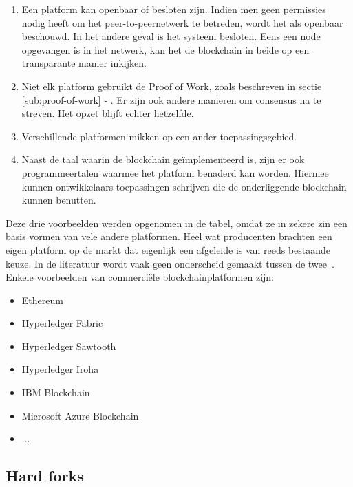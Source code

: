 \begin{enumerate}
	\item Een platform kan openbaar of besloten zijn. Indien men geen permissies nodig heeft om het peer-to-peernetwerk te betreden, wordt het als openbaar beschouwd. In het andere geval is het systeem besloten. Eens een node opgevangen is in het netwerk, kan het de blockchain in beide op een transparante manier inkijken.
	\item Niet elk platform gebruikt de Proof of Work, zoals beschreven in sectie \ref{sub:proof-of-work} - . Er zijn ook andere manieren om consensus na te streven. Het opzet blijft echter hetzelfde.
	\item Verschillende platformen mikken op een ander toepassingsgebied.
	\item Naast de taal waarin de blockchain geïmplementeerd is, zijn er ook programmeertalen waarmee het platform benaderd kan worden. Hiermee kunnen ontwikkelaars toepassingen schrijven die de onderliggende blockchain kunnen benutten. 
\end{enumerate}
	
\pagebreak
	
Deze drie voorbeelden werden opgenomen in de tabel, omdat ze in zekere zin een basis vormen van vele andere platformen. Heel wat producenten brachten een eigen platform op de markt dat eigenlijk een afgeleide is van reeds bestaande keuze. In de literatuur wordt vaak geen onderscheid gemaakt tussen de twee~\autocite{Gartner2022}. Enkele voorbeelden van commerciële blockchainplatformen zijn:
\begin{itemize}
	\item Ethereum
	\item Hyperledger Fabric
	\item Hyperledger Sawtooth
	\item Hyperledger Iroha
	\item IBM Blockchain
	\item Microsoft Azure Blockchain
	\item ...
\end{itemize}

\subsection{Hard forks}
\label{sub:hard-forks}

